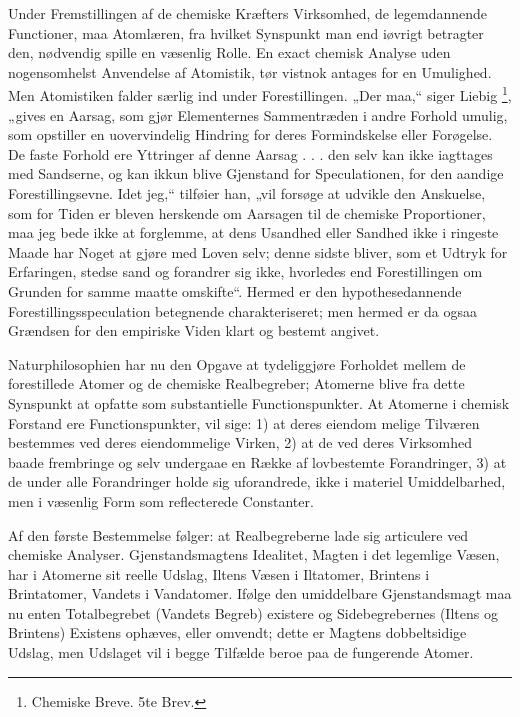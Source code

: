 \documentclass[12pt,a4paper]{book}
\begin{document}
Under Fremstillingen af de chemiske Kræfters Virksomhed, de legemdannende
Functioner, maa Atomlæren, fra hvilket Synspunkt man end iøvrigt betragter
den, nødvendig spille en væsenlig Rolle. En exact chemisk Analyse uden
nogensomhelst Anvendelse af Atomistik, tør vistnok antages for en
Umulighed. Men Atomistiken falder særlig ind under Forestillingen. „Der
maa,“ siger Liebig %
\footnote{%
Chemiske Breve. 5te Brev.}, „gives en Aarsag, som gjør Elementernes
Sammentræden i andre Forhold umulig, som opstiller en uovervindelig
Hindring for deres Formindskelse eller Forøgelse. De faste Forhold ere
Yttringer af denne Aarsag . . . den selv kan ikke iagttages med Sandserne,
og kan ikkun blive Gjenstand for Speculationen, for den aandige
Forestillingsevne. Idet jeg,“ tilføier han, „vil forsøge at udvikle den
Anskuelse, som for Tiden er bleven herskende om Aarsagen til de chemiske
Proportioner, maa jeg bede ikke at forglemme, at dens Usandhed eller
Sandhed ikke i ringeste Maade har Noget at gjøre med Loven selv; denne
sidste bliver, som et Udtryk for Erfaringen, stedse sand og forandrer sig
ikke, hvorledes end Forestillingen om Grunden for samme maatte omskifte“.
Hermed er den hypothesedannende Forestillingsspeculation betegnende
charakteriseret; men hermed er da ogsaa Grændsen for den empiriske Viden
klart og bestemt angivet.

Naturphilosophien har nu den Opgave at tydeliggjøre Forholdet mellem de
forestillede Atomer og de chemiske Realbegreber; Atomerne blive fra dette
Synspunkt at opfatte som substantielle Functionspunkter. At Atomerne i
chemisk Forstand ere Functionspunkter, vil sige: 1) at deres eiendom\-%
melige Tilværen bestemmes ved deres eiendommelige Virken, 2) at de ved
deres Virksomhed baade frembringe og selv undergaae en Række af
lovbestemte Forandringer, 3) at de under alle Forandringer holde sig
uforandrede, ikke i materiel Umiddelbarhed, men i væsenlig Form som
reflecterede Constanter.

Af den første Bestemmelse følger: at Realbegreberne lade sig articulere
ved chemiske Analyser. Gjenstandsmagtens Idealitet, Magten i det legemlige
Væsen, har i Atomerne sit reelle Udslag, Iltens Væsen i Iltatomer,
Brintens i Brintatomer, Vandets i Vandatomer. Ifølge den umiddelbare
Gjenstandsmagt maa nu enten Totalbegrebet (Vandets Begreb) existere og
Sidebegrebernes (Iltens og Brintens) Existens ophæves, eller omvendt;
dette er Magtens dobbeltsidige Udslag, men Udslaget vil i begge Tilfælde
beroe paa de fungerende Atomer.
\end{document}
